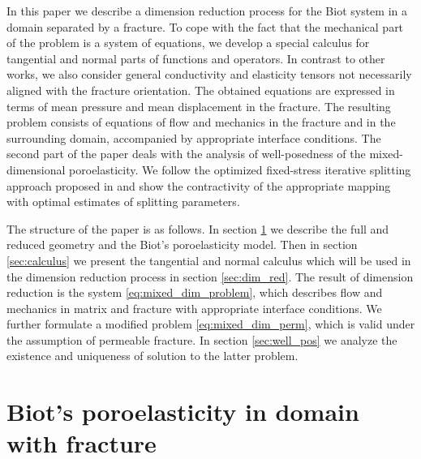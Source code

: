 \documentclass[a4paper]{article}
\begin{document}
In this paper we describe a dimension reduction process for the Biot system in a domain separated by a fracture.
To cope with the fact that the mechanical part of the problem is a system of equations, we develop a special calculus for tangential and normal parts of functions and operators.
In contrast to other works, we also consider general conductivity and elasticity tensors not necessarily aligned with the fracture orientation.
The obtained equations are expressed in terms of mean pressure and mean displacement in the fracture.
The resulting problem consists of equations of flow and mechanics in the fracture and in the surrounding domain, accompanied by appropriate interface conditions.
The second part of the paper deals with the analysis of well-posedness of the mixed-dimensional poroelasticity.
We follow the optimized fixed-stress iterative splitting approach proposed in \cite{mikelic2013convergence} and show the contractivity of the appropriate mapping with optimal estimates of splitting parameters.

The structure of the paper is as follows.
In section \ref{sec:model} we describe the full and reduced geometry and the Biot's poroelasticity model.
Then in section \ref{sec:calculus} we present the tangential and normal calculus which will be used in the dimension reduction process in section \ref{sec:dim_red}.
The result of dimension reduction is the system \eqref{eq:mixed_dim_problem}, which describes flow and mechanics in matrix and fracture with appropriate interface conditions.
We further formulate a modified problem \eqref{eq:mixed_dim_perm}, which is valid under the assumption of permeable fracture.
In section \ref{sec:well_pos} we analyze the existence and uniqueness of solution to the latter problem.


\section{Biot's poroelasticity in domain with fracture}\label{sec:model}
\end{document}
